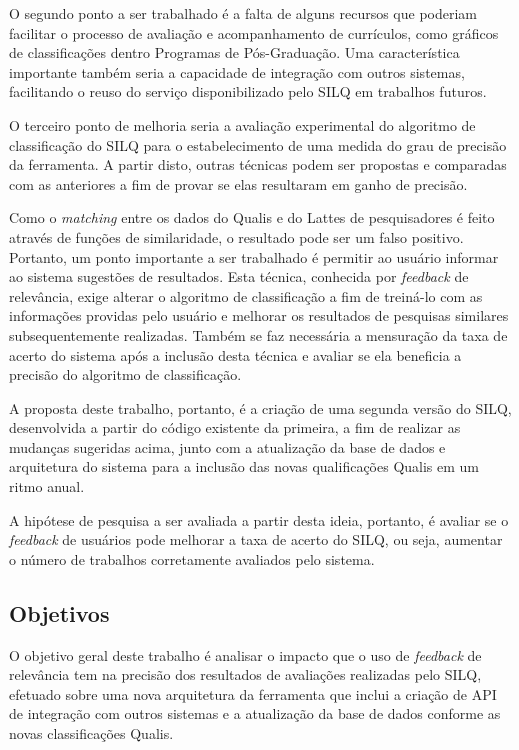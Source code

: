 \documentclass[12pt]{article}
\begin{document}
O segundo ponto a ser trabalhado é a falta de alguns recursos que poderiam facilitar o processo de avaliação e acompanhamento de currículos, como gráficos de classificações dentro Programas de Pós-Graduação. Uma característica importante também seria a capacidade de integração com outros sistemas, facilitando o reuso do serviço disponibilizado pelo SILQ em trabalhos futuros.

O terceiro ponto de melhoria seria a avaliação experimental do algoritmo de classificação do SILQ para o estabelecimento de uma medida do grau de precisão da ferramenta. A partir disto, outras técnicas podem ser propostas e comparadas com as anteriores a fim de provar se elas resultaram em ganho de precisão.

Como o \textit{matching} entre os dados do Qualis e do Lattes de pesquisadores é feito através de funções de similaridade, o resultado pode ser um falso positivo. Portanto, um ponto importante a ser trabalhado é permitir ao usuário informar ao sistema sugestões de resultados. Esta técnica, conhecida por \textit{feedback} de relevância, exige alterar o algoritmo de classificação a fim de treiná-lo com as informações providas pelo usuário e melhorar os resultados de pesquisas similares subsequentemente realizadas. Também se faz necessária a mensuração da taxa de acerto do sistema após a inclusão desta técnica e avaliar se ela beneficia a precisão do algoritmo de classificação.

A proposta deste trabalho, portanto, é a criação de uma segunda versão do SILQ, desenvolvida a partir do código existente da primeira, a fim de realizar as mudanças sugeridas acima, junto com a atualização da base de dados e arquitetura do sistema para a inclusão das novas qualificações Qualis em um ritmo anual.

A hipótese de pesquisa a ser avaliada a partir desta ideia, portanto, é avaliar se o \textit{feedback} de usuários pode melhorar a taxa de acerto do SILQ, ou seja, aumentar o número de trabalhos corretamente avaliados pelo sistema.

\subsection{Objetivos}

O objetivo geral deste trabalho é analisar o impacto que o uso de \textit{feedback} de relevância tem na precisão dos resultados de avaliações realizadas pelo SILQ, efetuado sobre uma nova arquitetura da ferramenta que inclui a criação de API de integração com outros sistemas e a atualização da base de dados conforme as novas classificações Qualis.
\end{document}
